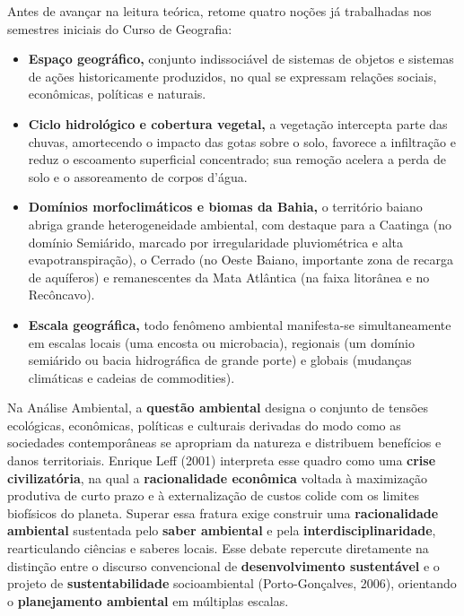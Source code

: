 \begin{capRevisao}
Antes de avançar na leitura teórica, retome quatro noções já trabalhadas nos semestres iniciais do Curso de Geografia:
\begin{itemize}[leftmargin=1.5em, itemsep=2.5pt]
  \item \textbf{Espaço geográfico,} conjunto indissociável de sistemas de objetos e sistemas de ações historicamente produzidos, no qual se expressam relações sociais, econômicas, políticas e naturais.
  \item \textbf{Ciclo hidrológico e cobertura vegetal,} a vegetação intercepta parte das chuvas, amortecendo o impacto das gotas sobre o solo, favorece a infiltração e reduz o escoamento superficial concentrado; sua remoção acelera a perda de solo e o assoreamento de corpos d'água.
  \item \textbf{Domínios morfoclimáticos e biomas da Bahia,} o território baiano abriga grande heterogeneidade ambiental, com destaque para a Caatinga (no domínio Semiárido, marcado por irregularidade pluviométrica e alta evapotranspiração), o Cerrado (no Oeste Baiano, importante zona de recarga de aquíferos) e remanescentes da Mata Atlântica (na faixa litorânea e no Recôncavo).
  \item \textbf{Escala geográfica,} todo fenômeno ambiental manifesta-se simultaneamente em escalas locais (uma encosta ou microbacia), regionais (um domínio semiárido ou bacia hidrográfica de grande porte) e globais (mudanças climáticas e cadeias de commodities).
\end{itemize}
\end{capRevisao}


\begin{boxSimbolo}
Na Análise Ambiental, a \textbf{questão ambiental} designa o conjunto de tensões ecológicas, econômicas, políticas e culturais derivadas do modo como as sociedades contemporâneas se apropriam da natureza e distribuem benefícios e danos territoriais. Enrique Leff (2001) interpreta esse quadro como uma \textbf{crise civilizatória}, na qual a \textbf{racionalidade econômica} voltada à maximização produtiva de curto prazo e à externalização de custos colide com os limites biofísicos do planeta. Superar essa fratura exige construir uma \textbf{racionalidade ambiental} sustentada pelo \textbf{saber ambiental} e pela \textbf{interdisciplinaridade}, rearticulando ciências e saberes locais. Esse debate repercute diretamente na distinção entre o discurso convencional de \textbf{desenvolvimento sustentável} e o projeto de \textbf{sustentabilidade} socioambiental (Porto-Gonçalves, 2006), orientando o \textbf{planejamento ambiental} em múltiplas escalas.
\end{boxSimbolo}

